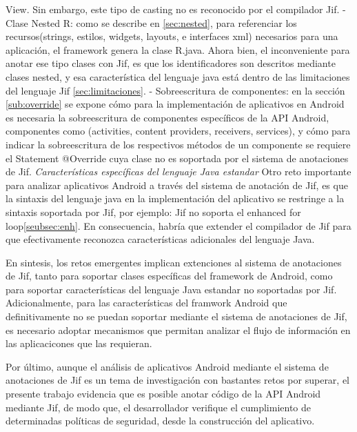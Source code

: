 View. Sin embargo, este tipo de casting no es reconocido por el compilador
Jif.\newline 
- Clase Nested R: como se describe en \ref{sec:nested}, para referenciar los
recursos(strings, estilos, widgets, layouts, e interfaces xml) necesarios para
una aplicación, el framework genera la clase R.java. Ahora bien, el
inconveniente para anotar ese tipo clases con Jif, es que los identificadores
son descritos mediante clases nested, y esa característica del lenguaje java
está dentro de las limitaciones del lenguaje Jif \ref{sec:limitaciones}.\newline 
- Sobreescritura de componentes: en la sección \ref{sub:override} se expone
cómo para la implementación de aplicativos en Android es necesaria la
sobreescritura de componentes específicos de la API Android, componentes como
(activities, content providers, receivers, services), y cómo para indicar la
sobreescritura de los respectivos métodos de un componente se requiere el
Statement @Override cuya clase no es soportada por el sistema de anotaciones de
Jif.\newline
\emph{Características específicas del lenguaje Java estandar}\newline
Otro reto importante para analizar aplicativos Android a través del sistema de
anotación de Jif, es que la sintaxis del lenguaje java en la implementación del
aplicativo se restringe a la sintaxis soportada por Jif, por ejemplo: Jif no
soporta el enhanced for loop\ref{seubsec:enh}. En consecuencia, habría que
extender el compilador de Jif para que efectivamente reconozca características
adicionales del lenguaje Java.\newline

En sintesis, los retos emergentes implican extenciones al sistema de
anotaciones de Jif, tanto para soportar clases específicas del framework de
Android, como para soportar características del lenguaje Java estandar no
soportadas por Jif.\newline
Adicionalmente, para las características del framwork Android que
definitivamente no se puedan soportar mediante el sistema de anotaciones de Jif,
es necesario adoptar mecanismos que permitan analizar el flujo de información en
las aplicacicones que las requieran.\newline

Por último, aunque el análisis de aplicativos Android mediante el sistema de
anotaciones de Jif es un tema de investigación con bastantes retos por superar,
el presente trabajo evidencia que es posible anotar código de la API Android
mediante Jif, de modo que, el desarrollador verifique el cumplimiento de
determinadas políticas de seguridad, desde la construcción del aplicativo.

